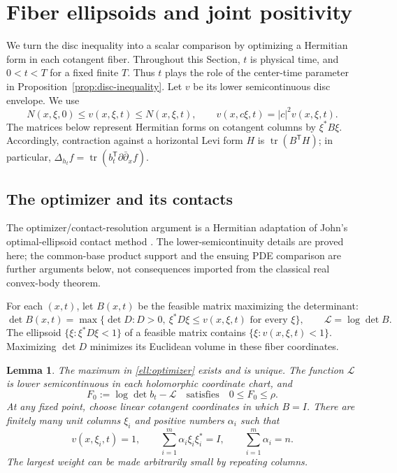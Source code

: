 \documentclass[11pt]{article}
\newtheorem{lemma}[theorem]{Lemma}
\theoremstyle{definition}
\theoremstyle{remark}
\newcommand{\dd}{\partial\bar\partial}
\DeclareMathOperator{\tr}{tr}
\numberwithin{equation}{section}
\begin{document}
\section{Fiber ellipsoids and joint positivity}\label{sec:ellipsoids}

We turn the disc inequality into a scalar comparison by optimizing a
Hermitian form in each cotangent fiber.  Throughout this Section, $t$ is
physical time, and $0<t<T$ for a fixed finite $T$.  Thus $t$ plays the
role of the center-time parameter in Proposition~\ref{prop:disc-inequality}.
Let $v$ be its lower semicontinuous disc envelope.  We use
\begin{equation}\label{ell:envelope-bounds}
 N(x,\xi,0)\le v(x,\xi,t)\le N(x,\xi,t),
 \qquad v(x,c\xi,t)=|c|^2v(x,\xi,t).
\end{equation}
The matrices below represent Hermitian forms on cotangent columns by
$\xi^*B\xi$.  Accordingly, contraction against a horizontal Levi form
$H$ is $\tr(B^{\mathsf T}H)$; in particular,
$\Delta_{h_t}f=\tr(b_t^{\mathsf T}\dd_xf)$.

\subsection{The optimizer and its contacts}

The optimizer/contact-resolution argument is a Hermitian adaptation of
John's optimal-ellipsoid contact method \cite{John1948}. The
lower-semicontinuity details are proved here; the common-base product
support and the ensuing PDE comparison are further arguments below,
not consequences imported from the classical real convex-body theorem.

For each $(x,t)$, let $B(x,t)$ be the feasible matrix maximizing the
determinant:
\begin{equation}\label{ell:optimizer}
 \det B(x,t)=\max\bigl\{\det D:
 D>0,\ \xi^*D\xi\le v(x,\xi,t)\text{ for every }\xi\bigr\},
 \qquad \mathcal L=\log\det B.
\end{equation}
The ellipsoid $\{\xi:\xi^*D\xi<1\}$ of a feasible matrix contains
$\{\xi:v(x,\xi,t)<1\}$.  Maximizing $\det D$ minimizes its Euclidean
volume in these fiber coordinates.

\begin{lemma}\label{ell:optimizer-contacts}
The maximum in \eqref{ell:optimizer} exists and is unique.
The function $\mathcal L$ is lower semicontinuous in each holomorphic
coordinate chart, and
\begin{equation}\label{ell:volume-gap}
 F_0:=\log\det b_t-\mathcal L
 \quad\text{satisfies}\quad 0\le F_0\le\rho.
\end{equation}
At any fixed point, choose linear cotangent coordinates in which $B=I$.
There are finitely many unit columns $\xi_i$ and positive numbers
$\alpha_i$ such that
\begin{equation}\label{ell:contact-resolution}
 v(x,\xi_i,t)=1,\qquad
 \sum_{i=1}^m\alpha_i\xi_i\xi_i^*=I,
 \qquad \sum_{i=1}^m\alpha_i=n.
\end{equation}
The largest weight can be made arbitrarily small by repeating columns.
\end{lemma}
\end{document}
